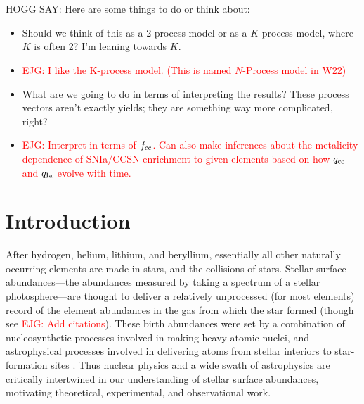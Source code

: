 \documentclass[modern]{aastex631}
\newcommand{\fcc}{f_{\rm cc}}
\newcommand{\qIa}{q_{\rm Ia}}
\newcommand{\qcc}{q_{\rm cc}}
\newcommand{\ejg}[1]{\textcolor{red}{EJG: #1}}
\begin{document}

\section*{}\clearpage
HOGG SAY: Here are some things to do or think about:
\begin{itemize}
  \item Should we think of this as a 2-process model or as a $K$-process model, where $K$ is often 2? I'm leaning towards $K$.
  \item \ejg{I like the K-process model. (This is named $N$-Process model in W22)}
  \item What are we going to do in terms of interpreting the results? These process vectors aren't exactly yields; they are something way more complicated, right?
  \item \ejg{Interpret in terms of $\fcc$. Can also make inferences about the metalicity dependence of SNIa/CCSN enrichment to given elements based on how $\qcc$ and $\qIa$ evolve with time.}
\end{itemize}

\section{Introduction}\label{sec:intro}

After hydrogen, helium, lithium, and beryllium, essentially all other naturally occurring elements are made in stars, and the collisions of stars.
Stellar surface abundances---the abundances measured by taking a spectrum of a stellar photosphere---are thought to deliver a relatively unprocessed (for most elements) record of the element abundances in the gas from which the star formed (though see \ejg{Add citations}).
These birth abundances were set by a combination of nucleosynthetic processes involved in making heavy atomic nuclei, and astrophysical processes involved in delivering atoms from stellar interiors to star-formation sites \citep[e.g.,][]{johnsonja2020}.
Thus nuclear physics and a wide swath of astrophysics are critically intertwined in our understanding of stellar surface abundances, motivating theoretical, experimental, and observational work.
\end{document}
